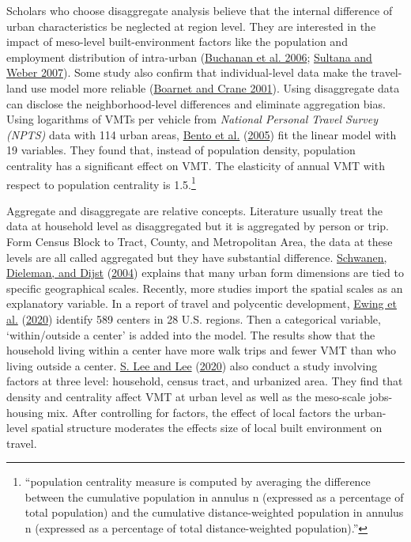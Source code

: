 \documentclass[
  11pt,
  openany]{memoir}
\begin{document}
Scholars who choose disaggregate analysis believe that the internal difference of urban characteristics be neglected at region level. They are interested in the impact of meso-level built-environment factors like the population and employment distribution of intra-urban (\protect\hyperlink{ref-buchananEffectUrbanGrowth2006}{Buchanan et al. 2006}; \protect\hyperlink{ref-sultanaJourneytoWorkPatternsAge2007}{Sultana and Weber 2007}).
Some study also confirm that individual-level data make the travel-land use model more reliable (\protect\hyperlink{ref-boarnetInfluenceLandUse2001}{Boarnet and Crane 2001}).
Using disaggregate data can disclose the neighborhood-level differences and eliminate aggregation bias. Using logarithms of VMTs per vehicle from \emph{National Personal Travel Survey (NPTS)} data with 114 urban areas, \protect\hyperlink{ref-bentoEffectsUrbanSpatial2005}{Bento et al.} (\protect\hyperlink{ref-bentoEffectsUrbanSpatial2005}{2005}) fit the linear model with 19 variables. They found that, instead of population density, population centrality has a significant effect on VMT. The elasticity of annual VMT with respect to population centrality is 1.5.\footnote{``population centrality measure is computed by averaging the difference between the cumulative population in annulus n (expressed as a percentage of total population) and the cumulative distance-weighted population in annulus n (expressed as a percentage of total distance-weighted population).''}

Aggregate and disaggregate are relative concepts. Literature usually treat the data at household level as disaggregated but it is aggregated by person or trip. Form Census Block to Tract, County, and Metropolitan Area, the data at these levels are all called aggregated but they have substantial difference.
\protect\hyperlink{ref-schwanenImpactMetropolitanStructure2004}{Schwanen, Dieleman, and Dijst} (\protect\hyperlink{ref-schwanenImpactMetropolitanStructure2004}{2004}) explains that many urban form dimensions are tied to specific geographical scales. Recently, more studies import the spatial scales as an explanatory variable. In a report of travel and polycentic development, \protect\hyperlink{ref-ewingReducingVehicleMiles2020}{Ewing et al.} (\protect\hyperlink{ref-ewingReducingVehicleMiles2020}{2020}) identify 589 centers in 28 U.S. regions. Then a categorical variable, `within/outside a center' is added into the model. The results show that the household living within a center have more walk trips and fewer VMT than who living outside a center.
\protect\hyperlink{ref-leeComparingImpactsLocal2020}{S. Lee and Lee} (\protect\hyperlink{ref-leeComparingImpactsLocal2020}{2020}) also conduct a study involving factors at three level: household, census tract, and urbanized area. They find that density and centrality affect VMT at urban level as well as the meso-scale jobs-housing mix. After controlling for factors, the effect of local factors the urban-level spatial structure moderates the effects size of local built environment on travel.
\end{document}

